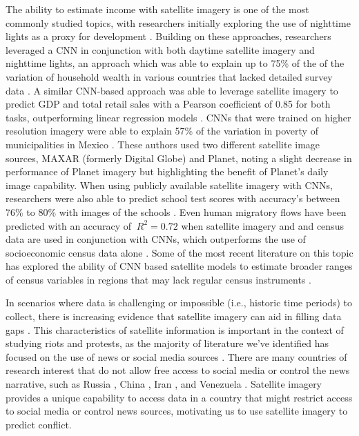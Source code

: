 The ability to estimate income with satellite imagery is one of the most commonly studied topics, with researchers initially exploring the use of nighttime lights as a proxy for development \citep{elvidge2012night}.  Building on these approaches, researchers leveraged a CNN in conjunction with both daytime satellite imagery and nighttime lights, an approach which was able to explain up to 75\% of the of the variation of household wealth in various countries that lacked detailed survey data \citep{jean2016combining}.  A similar CNN-based approach was able to leverage satellite imagery to predict GDP and total retail sales with a Pearson coefficient of 0.85 for both tasks, outperforming linear regression models \citep{wu2019estimation}. CNNs that were trained on higher resolution imagery were able to explain 57\% of the variation in poverty of municipalities in Mexico \citep{babenko2017poverty}.  These authors used two different satellite image sources, MAXAR (formerly Digital Globe) and Planet, noting a slight decrease in performance of Planet imagery but highlighting the benefit of Planet's daily image capability.  When using publicly available satellite imagery with CNNs, researchers were also able to predict school test scores with accuracy's between 76\% to 80\% with images of the schools \citep{runfola2022using}.  Even human migratory flows have been predicted with an accuracy of $\ R^{2}= 0.72$ when satellite imagery and and census data are used in conjunction with CNNs, which outperforms the use of socioeconomic census data alone \citep{runfola2022deep}.  Some of the most recent literature on this topic has explored the ability of CNN based satellite models to estimate broader ranges of census variables in regions that may lack regular census instruments \citep{runfola2024multi}.

In scenarios where data is challenging or impossible (i.e., historic time periods) to collect, there is increasing evidence that satellite imagery can aid in filling data gaps \citep{goodman2021convolutional,jean2016combining,bharti2018fluctuations,hu2019mapping, aung2021using}.  This characteristics of satellite information is important in the context of studying riots and protests, as the majority of literature we've identified has focused on the use of news or social media sources \citep{purbrick2019report, greer2010we, wu2017forecasting, ciorciari2016nationalist, becker2011beyond, korolov2016predicting, renaud2019social, phillips2017using, cadena2015forecasting, filchenkov2014more, compton2013detecting, alsaedi2017can}.  There are many countries of research interest that do not allow free access to social media or control the news narrative, such as Russia \citep{gehlbach2010reflections}, China \citep{tai2014china}, Iran \citep{rahimi2015censorship}, and Venezuela \citep{pain2021everything}.  Satellite imagery provides a unique capability to access data in a country that might restrict access to social media or control news sources, motivating us to use satellite imagery to predict conflict. 

